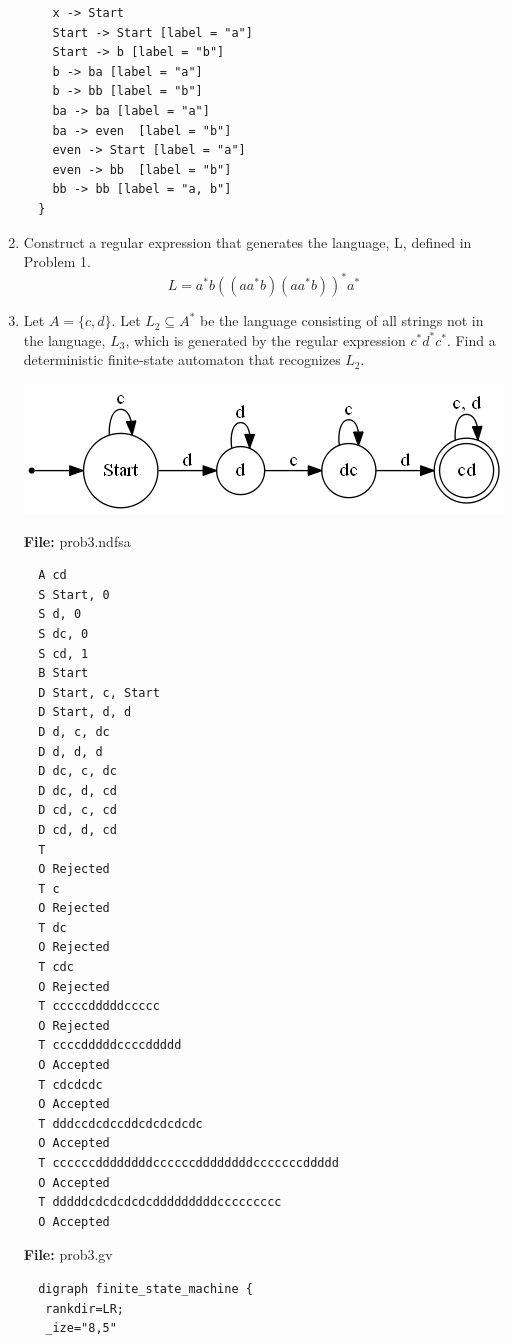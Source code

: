 \documentclass[a4paper]{article}
\begin{document}
\begin{enumerate}
\begin{verbatim}
    x -> Start
    Start -> Start [label = "a"]
    Start -> b [label = "b"]
    b -> ba [label = "a"]
    b -> bb [label = "b"]
    ba -> ba [label = "a"]
    ba -> even  [label = "b"]
    even -> Start [label = "a"]
    even -> bb  [label = "b"]
    bb -> bb [label = "a, b"]
  }
    \end{verbatim}

    \item Construct a regular expression that generates the language, L, defined
    in Problem 1.
    $$L = a^{*}  b  ((aa^{*}b)(aa^{*}b))^{*}   a^{*}$$

    \vspace{1cm}

    \item  Let $A = \{c,d\}$. Let $L_{2} \subseteq A^{*}$ be the language consisting 
    of all strings not in the language, $L_{3}$, which is generated by the regular 
    expression $c^{*}d^{*}c^{*}$. Find a deterministic finite-state automaton that recognizes 
    $L_{2}$.
    \begin{center}
      \includegraphics[scale=0.5]{3} \\
    \end{center}

    \newpage
    \textbf{File:} prob3.ndfsa
    \begin{multicols}{2}
    \begin{verbatim}
  A cd
  S Start, 0
  S d, 0
  S dc, 0
  S cd, 1
  B Start
  D Start, c, Start
  D Start, d, d
  D d, c, dc
  D d, d, d
  D dc, c, dc
  D dc, d, cd
  D cd, c, cd
  D cd, d, cd
  T 
  O Rejected
  T c
  O Rejected
  T dc
  O Rejected
  T cdc
  O Rejected
  T cccccdddddccccc
  O Rejected
  T ccccdddddccccddddd
  O Accepted
  T cdcdcdc
  O Accepted
  T dddccdcdccddcdcdcdcdc
  O Accepted
  T ccccccddddddddccccccddddddddcccccccddddd
  O Accepted
  T dddddcdcdcdcdcdddddddddccccccccc
  O Accepted 
    \end{verbatim}
    \end{multicols}

    \textbf{File:} prob3.gv
    \begin{verbatim}
  digraph finite_state_machine {
   rankdir=LR;
   _ize="8,5"


\end{verbatim}
\end{enumerate}
\end{document}
